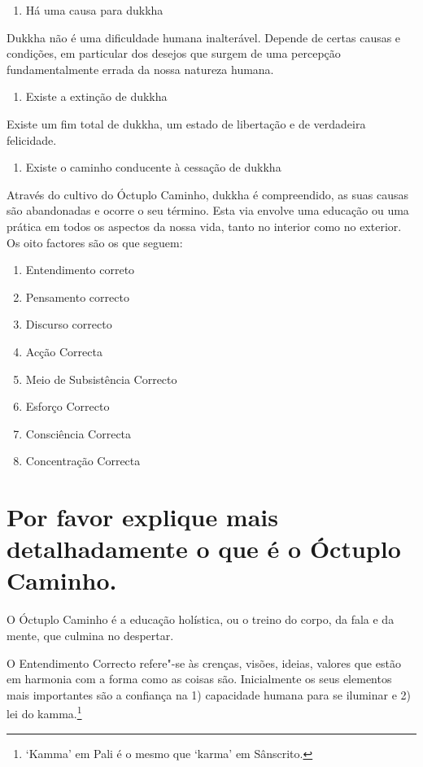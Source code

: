 \begin{enumerate}[resume,topsep=0pt]
\item Há uma causa para dukkha
\end{enumerate}

Dukkha não é uma dificuldade humana inalterável. Depende de certas
causas e condições, em particular dos desejos que surgem de uma
percepção fundamentalmente errada da nossa natureza humana.

\begin{enumerate}[resume,topsep=0pt]
\item Existe a extinção de dukkha
\end{enumerate}

Existe um fim total de dukkha, um estado de libertação e de verdadeira
felicidade.

\begin{enumerate}[resume,topsep=0pt]
\item Existe o caminho conducente à cessação de dukkha
\end{enumerate}

Através do cultivo do Óctuplo Caminho, dukkha é compreendido, as suas
causas são abandonadas e ocorre o seu término. Esta via envolve uma
educação ou uma prática em todos os aspectos da nossa vida, tanto no
interior como no exterior. Os oito factores são os que seguem:

\begin{enumerate}
\item Entendimento correto
\item Pensamento correcto
\item Discurso correcto
\item Acção Correcta
\item Meio de Subsistência Correcto
\item Esforço Correcto
\item Consciência Correcta
\item Concentração Correcta
\end{enumerate}

\section{Por favor explique mais detalhadamente o que é o Óctuplo Caminho.}

O Óctuplo Caminho é a educação holística, ou o treino do corpo, da fala
e da mente, que culmina no despertar.

O Entendimento Correcto refere"-se às crenças, visões, ideias, valores
que estão em harmonia com a forma como as coisas são. Inicialmente os
seus elementos mais importantes são a confiança na 1) capacidade humana
para se iluminar e 2) lei do kamma.\footnote{`Kamma' em Pali é o mesmo que `karma' em Sânscrito.}

